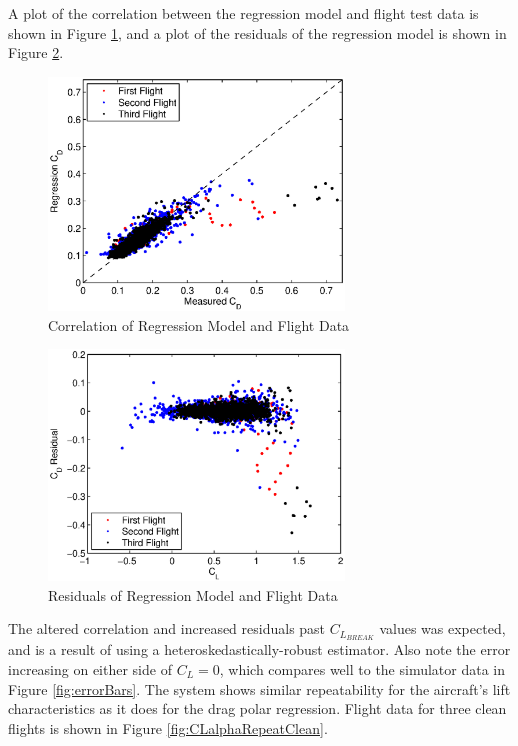 A plot of the correlation between the regression model and flight test data is shown in Figure \ref{fig:correlationClean}, and a plot of the residuals of the regression model is shown in Figure \ref{fig:residualsClean}.
\begin{figure}[H]
	\centering
	\includegraphics[width=0.7\textwidth]{figures/correlationClean.eps} \caption{Correlation of Regression Model and Flight Data} \label{fig:correlationClean}
\end{figure}
\begin{figure}[H]
	\centering
	\includegraphics[width=0.7\textwidth]{figures/residualsClean.eps} \caption{Residuals of Regression Model and Flight Data} \label{fig:residualsClean}
\end{figure}
The altered correlation and increased residuals past $C_{L_{BREAK}}$ values was expected, and is a result of using a heteroskedastically-robust estimator. Also note the error increasing on either side of $C_L = 0$, which compares well to the simulator data in Figure \ref{fig:errorBars}.
The system shows similar repeatability for the aircraft's lift characteristics as it does for the drag polar regression. Flight data for three clean flights is shown in Figure \ref{fig:CLalphaRepeatClean}.
